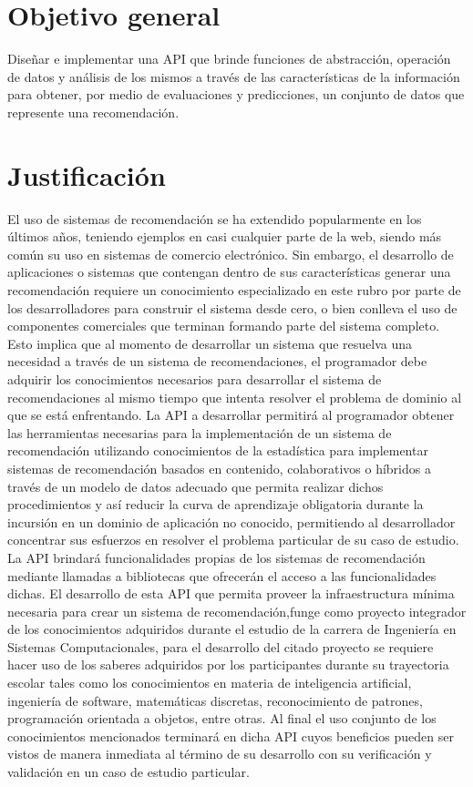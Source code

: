   \section {Objetivo general}
    Diseñar e implementar una API que brinde funciones de abstracción, operación de datos y análisis de los mismos a través de las características de  la información para obtener, por medio de evaluaciones y predicciones, un conjunto de datos que represente una recomendación.

  \section{Justificación}
    El uso de sistemas de recomendación se ha extendido popularmente en los últimos años, teniendo ejemplos en casi cualquier parte de la web, siendo más común su uso en sistemas de comercio electrónico. Sin embargo, el desarrollo de aplicaciones o sistemas que contengan dentro de sus características generar una recomendación requiere un conocimiento especializado en este rubro por parte de los desarrolladores para construir el sistema desde cero, o bien conlleva el uso de componentes comerciales que terminan formando parte del sistema completo. Esto implica que al momento de desarrollar un sistema que resuelva una necesidad a través de un sistema de recomendaciones, el programador debe adquirir los conocimientos necesarios para desarrollar el sistema de recomendaciones al mismo tiempo que intenta resolver el problema de dominio al que se está enfrentando. La API a desarrollar permitirá al programador obtener las herramientas necesarias para la implementación de un sistema de recomendación utilizando conocimientos de la estadística para implementar sistemas de recomendación basados en contenido, colaborativos o híbridos a través de un modelo de datos adecuado que permita realizar dichos procedimientos y así reducir la curva de aprendizaje obligatoria durante la incursión en un dominio de aplicación no conocido, permitiendo al desarrollador concentrar sus esfuerzos en resolver el problema particular de su caso de estudio. \\

    La API brindará funcionalidades propias de los sistemas de recomendación mediante llamadas a bibliotecas que ofrecerán el acceso a las funcionalidades dichas. El desarrollo de esta API que permita proveer la infraestructura mínima necesaria para crear un sistema de recomendación,funge como proyecto integrador de los conocimientos adquiridos durante el estudio de la carrera de Ingeniería en Sistemas Computacionales, para el desarrollo del citado proyecto se requiere hacer uso de los saberes adquiridos por los participantes durante su trayectoria escolar tales como los conocimientos en materia de inteligencia artificial, ingeniería de software, matemáticas discretas, reconocimiento de patrones, programación orientada a objetos, entre otras. Al final el uso conjunto de los conocimientos mencionados terminará en dicha API cuyos beneficios pueden ser vistos de manera inmediata al término de su desarrollo con su verificación y validación en un caso de estudio particular.
